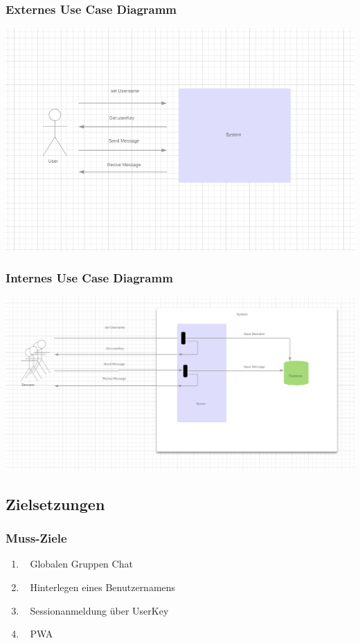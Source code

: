 \documentclass[12pt]{article}
\begin{document}
      \subsubsection{Externes Use Case Diagramm}
        \includegraphics[width=\textwidth]{extern-usecase.png}
      \subsubsection{Internes Use Case Diagramm}
        \includegraphics[width=\textwidth]{intern-usecase.png}

    \subsection{Zielsetzungen}
      \subsubsection{Muss-Ziele}
        \begin{enumerate}
          \item \faGlobe~ Globalen Gruppen Chat
          \item \faUser~ Hinterlegen eines Benutzernamens
          \item \faKey~ Sessionanmeldung über UserKey
          \item \faMobile~ PWA
        \end{enumerate}
\end{document}
